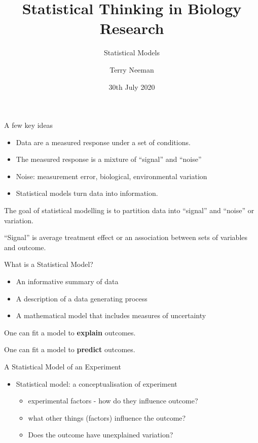 \documentclass[
  12pt,
  ignorenonframetext,
  aspectratio=169,
]{beamer}
\title{Statistical Thinking in Biology Research}
\subtitle{Statistical Models}
\author{Terry Neeman}
\date{30th July 2020}
\institute{Australian National University}
\providecommand{\tightlist}{%
  \setlength{\itemsep}{0pt}\setlength{\parskip}{0pt}}
\begin{document}
\frame{\titlepage}

\begin{frame}{A few key ideas}
\protect\hypertarget{a-few-key-ideas}{}

\begin{itemize}
\tightlist
\item
  Data are a measured response under a set of conditions.
\item
  The measured response is a mixture of ``signal'' and ``noise''
\item
  Noise: measurement error, biological, environmental variation
\item
  Statistical models turn data into information.
\end{itemize}

\begin{block}{The goal of statistical modelling is to partition data
into ``signal'' and ``noise'' or variation.}

\end{block}

\begin{block}{``Signal'' is average treatment effect or an association
between sets of variables and outcome.}

\end{block}

\end{frame}

\begin{frame}{What is a Statistical Model?}
\protect\hypertarget{what-is-a-statistical-model}{}

\begin{itemize}
\tightlist
\item
  An informative summary of data
\item
  A description of a data generating process
\item
  A mathematical model that includes measures of uncertainty
\end{itemize}

One can fit a model to \textbf{explain} outcomes.

One can fit a model to \textbf{predict} outcomes.

\end{frame}

\begin{frame}{A Statistical Model of an Experiment}
\protect\hypertarget{a-statistical-model-of-an-experiment}{}

\begin{itemize}
\tightlist
\item
  Statistical model: a conceptualisation of experiment

  \begin{itemize}
  \tightlist
  \item
    experimental factors - how do they influence outcome?
  \item
    what other things (factors) influence the outcome?
  \item
    Does the outcome have unexplained variation?
  \end{itemize}
\end{itemize}

\end{frame}
\end{document}
